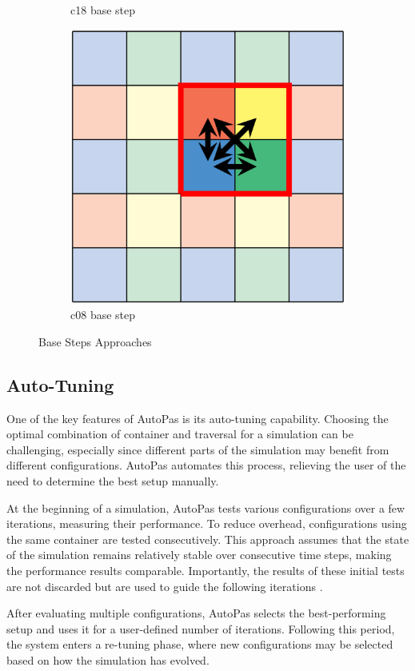 \begin{figure}[htbp]
\begin{subfigure}[b]{0.3\textwidth}
        \caption{\scriptsize c18 base step}
        \label{fig:c18}
    \end{subfigure}
    \begin{subfigure}[b]{0.3\textwidth}
        \centering
        \includegraphics[width=\linewidth]{imgs/c08.png}
        \caption{\scriptsize c08 base step}
        \label{fig:c08}
    \end{subfigure}
    \caption{Base Steps Approaches \parencite{newcome2023towards}}
\end{figure}



\subsection{Auto-Tuning}

One of the key features of AutoPas is its auto-tuning capability. Choosing the optimal combination of container and traversal for a simulation can be challenging, especially since different parts of the simulation may benefit from different configurations. AutoPas automates this process, relieving the user of the need to determine the best setup manually.

At the beginning of a simulation, AutoPas tests various configurations over a few iterations, measuring their performance. To reduce overhead, configurations using the same container are tested consecutively. This approach assumes that the state of the simulation remains relatively stable over consecutive time steps, making the performance results comparable. Importantly, the results of these initial tests are not discarded but are used to guide the following iterations \parencite{gratl2019autopas}.

After evaluating multiple configurations, AutoPas selects the best-performing setup and uses it for a user-defined number of iterations. Following this period, the system enters a re-tuning phase, where new configurations may be selected based on how the simulation has evolved.

